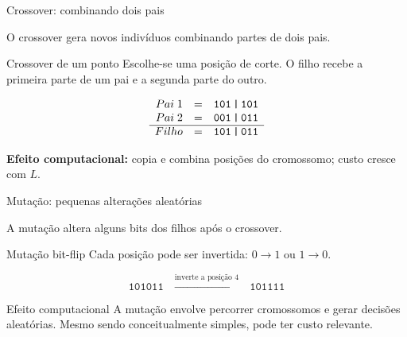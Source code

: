 \documentclass[aspectratio=169,11pt]{beamer}
\newcommand{\bits}[1]{\texttt{#1}}
\begin{document}
\begin{frame}{Crossover: combinando dois pais}

    \vspace{0.10cm}

    O crossover gera novos indivíduos combinando partes de dois pais.

    \vspace{0.20cm}

    \begin{questionbox}{Crossover de um ponto}
        Escolhe-se uma posição de corte. O filho recebe a primeira parte de
        um pai e a segunda parte do outro.
    \end{questionbox}

    \vspace{0.25cm}

    \[
        \begin{array}{rcl}
        Pai\;1 &=& \bits{101\,|\,101} \\
        Pai\;2 &=& \bits{001\,|\,011} \\
        \hline
        Filho &=& \bits{101\,|\,011}
        \end{array}
    \]

    \vspace{0.08cm}

    \textbf{Efeito computacional:}
    copia e combina posições do cromossomo; custo cresce com $L$.

\end{frame}


\begin{frame}{Mutação: pequenas alterações aleatórias}

    \vspace{0.10cm}

    A mutação altera alguns bits dos filhos após o crossover.

    \vspace{0.20cm}

    \begin{questionbox}{Mutação bit-flip}
        Cada posição pode ser invertida: $0 \rightarrow 1$ ou $1 \rightarrow 0$.
    \end{questionbox}

    \vspace{0.25cm}

    \[
        \bits{101011}
        \quad \xrightarrow{\text{inverte a posição 4}} \quad
        \bits{101111}
    \]

    \vspace{0.20cm}

    \begin{impactbox}{Efeito computacional}
        A mutação envolve percorrer cromossomos e gerar decisões aleatórias.
        Mesmo sendo conceitualmente simples, pode ter custo relevante.
    \end{impactbox}

\end{frame}
\end{document}
